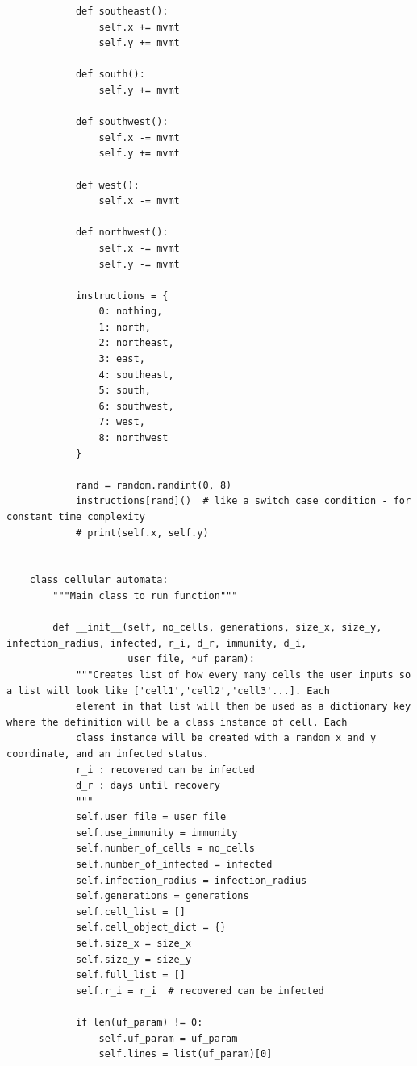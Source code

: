 \documentclass[11pt, a4paper]{article}
\begin{document}
\begin{lstlisting}
            def southeast():
                self.x += mvmt
                self.y += mvmt
    
            def south():
                self.y += mvmt
    
            def southwest():
                self.x -= mvmt
                self.y += mvmt
    
            def west():
                self.x -= mvmt
    
            def northwest():
                self.x -= mvmt
                self.y -= mvmt
    
            instructions = {
                0: nothing,
                1: north,
                2: northeast,
                3: east,
                4: southeast,
                5: south,
                6: southwest,
                7: west,
                8: northwest
            }
    
            rand = random.randint(0, 8)
            instructions[rand]()  # like a switch case condition - for constant time complexity
            # print(self.x, self.y)
    
    
    class cellular_automata:
        """Main class to run function"""
    
        def __init__(self, no_cells, generations, size_x, size_y, infection_radius, infected, r_i, d_r, immunity, d_i,
                     user_file, *uf_param):
            """Creates list of how every many cells the user inputs so a list will look like ['cell1','cell2','cell3'...]. Each
            element in that list will then be used as a dictionary key where the definition will be a class instance of cell. Each
            class instance will be created with a random x and y coordinate, and an infected status.
            r_i : recovered can be infected
            d_r : days until recovery
            """
            self.user_file = user_file
            self.use_immunity = immunity
            self.number_of_cells = no_cells
            self.number_of_infected = infected
            self.infection_radius = infection_radius
            self.generations = generations
            self.cell_list = []
            self.cell_object_dict = {}
            self.size_x = size_x
            self.size_y = size_y
            self.full_list = []
            self.r_i = r_i  # recovered can be infected
    
            if len(uf_param) != 0:
                self.uf_param = uf_param
                self.lines = list(uf_param)[0]
    

\end{lstlisting}
\end{document}
